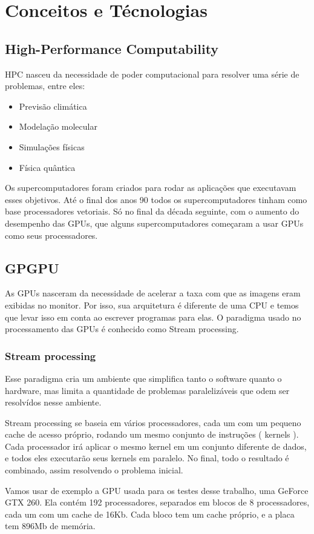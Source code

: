 \section{Conceitos e Técnologias}
\subsection{High-Performance Computability}
HPC nasceu da necessidade de poder computacional para resolver uma série de problemas, entre eles:
\begin{itemize}
  \item Previsão climática
  \item Modelação molecular
  \item Simulações físicas
  \item Física quântica
\end{itemize}
Os supercomputadores foram criados para rodar as aplicações que executavam esses objetivos. Até o final
dos anos 90 todos os supercomputadores tinham como base processadores vetoriais. Só no final da década seguinte, 
com o aumento do desempenho das GPUs, que alguns supercomputadores começaram a usar GPUs como seus processadores.
\subsection{GPGPU}
As GPUs nasceram da necessidade de acelerar a taxa com que as imagens eram exibidas no monitor. Por isso, sua arquitetura
é diferente de uma CPU e temos que levar isso em conta ao escrever programas para elas. O paradigma usado no processamento
das GPUs é conhecido como Stream processing.

\subsubsection{Stream processing}
Esse paradigma cria um ambiente que simplifica tanto o software quanto o hardware, mas limita a quantidade de problemas 
paralelizáveis que odem ser resolvídos nesse ambiente.

Stream processing se baseia em vários processadores, cada um com um pequeno cache de acesso próprio, 
rodando um mesmo conjunto de instruções ( kernels ). Cada processador irá aplicar o mesmo kernel em um
conjunto diferente de dados, e todos eles executarão seus kernels em paralelo. No final, todo o resultado é
combinado, assim resolvendo o problema inicial.

Vamos usar de exemplo a GPU usada para os testes desse trabalho, uma GeForce GTX 260. Ela contém
192 processadores, separados em blocos de 8 processadores, cada um com um cache de 16Kb. Cada bloco
tem um cache próprio, e a placa tem 896Mb de memória.

